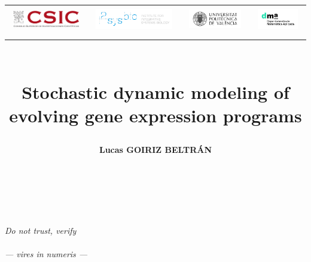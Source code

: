 \documentclass[11pt]{book}
\title{
  \begin{center}
    \vspace{-3cm}
    \begin{adjustbox}{center}
    \begin{tabular}{cccc}
        \includegraphics[height=0.8cm]{assets/csic_logo.png} &
        \includegraphics[height=1cm]{assets/i2sysbio_logo.png} &
        \includegraphics[height=0.9cm]{assets/upv_logo.png} &
        \includegraphics[height=1cm]{assets/dma_logo.jpg}
    \end{tabular}
    \end{adjustbox}
  
    \vspace{1cm}
  \end{center}
  \vspace{2cm}
  \makebox[\textwidth][c]{\rule{.9\textwidth}{2pt}}\\[1.2ex]
  \textbf{Stochastic dynamic modeling of evolving gene expression programs}\\[0.5ex]
  \makebox[\textwidth][c]{\rule{.9\textwidth}{2pt}}
}
\author{\textbf{Lucas GOIRIZ BELTRÁN}}
\date{
    \vfill
    \textbf{
        Thesis Advisors:\\
        Dr. Guillermo RODRIGO TÁRREGA\\
        Prof. Dr. J. Alberto CONEJERO CASARES
    }
    \vspace{1cm}
    \begin{center}
    Valencia, March 2025
    \end{center}
}
\theoremstyle{definition}
\begin{document}
\maketitle
{}
\pagebreak ~

\chapter*{}

\vspace*{1cm}
\begin{flushright}
\textit{Do not trust, verify ~~\\ ~ \\ --- vires in numeris ---}
\end{flushright}

\chapter*{}


\chapter*{}
\tableofcontents
\vfill
\pagebreak
\thispagestyle{almostempty}


\pagestyle{plain}

\vfill
\pagebreak
\newpage ~


\vfill
\pagebreak ~



\vfill
\pagebreak ~


\vfill
\pagebreak ~


\vfill
\pagebreak ~


\vfill
\pagebreak ~


\vfill
\pagebreak ~



\vfill
\pagebreak ~
  

\vfill
\pagebreak
\thispagestyle{almostempty}
\newpage ~
\end{document}
